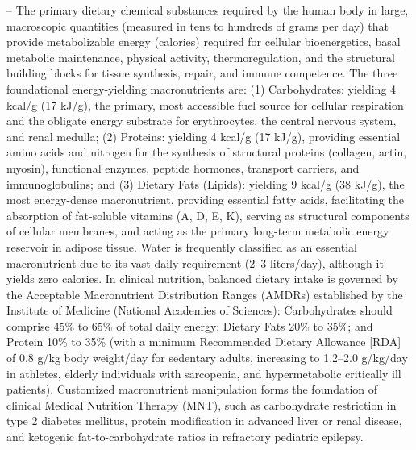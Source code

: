 -- The primary dietary chemical substances required by the human body in large, macroscopic quantities (measured in tens to hundreds of grams per day) that provide metabolizable energy (calories) required for cellular bioenergetics, basal metabolic maintenance, physical activity, thermoregulation, and the structural building blocks for tissue synthesis, repair, and immune competence. The three foundational energy-yielding macronutrients are: (1) Carbohydrates: yielding 4 kcal/g (17 kJ/g), the primary, most accessible fuel source for cellular respiration and the obligate energy substrate for erythrocytes, the central nervous system, and renal medulla; (2) Proteins: yielding 4 kcal/g (17 kJ/g), providing essential amino acids and nitrogen for the synthesis of structural proteins (collagen, actin, myosin), functional enzymes, peptide hormones, transport carriers, and immunoglobulins; and (3) Dietary Fats (Lipids): yielding 9 kcal/g (38 kJ/g), the most energy-dense macronutrient, providing essential fatty acids, facilitating the absorption of fat-soluble vitamins (A, D, E, K), serving as structural components of cellular membranes, and acting as the primary long-term metabolic energy reservoir in adipose tissue. Water is frequently classified as an essential macronutrient due to its vast daily requirement (2--3 liters/day), although it yields zero calories. In clinical nutrition, balanced dietary intake is governed by the Acceptable Macronutrient Distribution Ranges (AMDRs) established by the Institute of Medicine (National Academies of Sciences): Carbohydrates should comprise 45\% to 65\% of total daily energy; Dietary Fats 20\% to 35\%; and Protein 10\% to 35\% (with a minimum Recommended Dietary Allowance [RDA] of 0.8 g/kg body weight/day for sedentary adults, increasing to 1.2--2.0 g/kg/day in athletes, elderly individuals with sarcopenia, and hypermetabolic critically ill patients). Customized macronutrient manipulation forms the foundation of clinical Medical Nutrition Therapy (MNT), such as carbohydrate restriction in type 2 diabetes mellitus, protein modification in advanced liver or renal disease, and ketogenic fat-to-carbohydrate ratios in refractory pediatric epilepsy.

